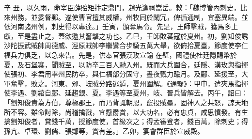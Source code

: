 \begin{pinyinscope}
 辛
 丑，以久雨，命宰臣薛貽矩抃定鼎門，趙光逢祠嵩岳。敕：「魏博管內刺史，比來州務，並委督郵。遂使曹官擅其威權，州牧同於閑冗，俾循通制，宜塞異端。並依河南諸州例，刺史得以專達。」壬寅，頒奪馬令。先是，王師擊賊，獲馬多上獻，至是盡止之，蓋欲邀其奮擊之功也。乙巳，王師敗蕃寇於夏州。初，劉知俊誘沙陀振武賊帥周德威、涇原賊帥李繼鸞合步騎五萬大舉，欲俯拾夏臺，節度使李仁福兵力俱乏，以急來告。先是，供奉官張漢玫宣諭
 在壁，國禮使杜廷隱賜幣於夏，及石堡寨，聞賊至，以防卒三百人馳入州。既而大兵圍合，廷隱、漢玫與指揮使張初、李君用率州民防卒，與仁福部分固守，晝夜戮力踰月。及鄜、延援至，大軍奮擊，敗之。河東、邠、岐賊分路逃遁，夏州圍解。《通鑒》：甲申，遣夾馬指揮使李遇、劉綰自鄜、延趨銀、夏。李遇等至夏州，岐、晉兵皆解去。丙午，詔曰：「劉知俊貴為方伯，尊極郡王，而乃背誕朝恩，竄投賊壘，固神人之共怒，諒天地所不容。雖命討除，尚稽擒戮，宜懸爵賞，以大功名，必有忠貞，咸思憤發。有生
 擒劉知俊者，賞錢千萬，授節度使，首級次之；得孟審登者，錢百萬，除刺史；得孫亢、卓環、劉儒、張鄰等，賞有差。」乙卯，宴會群臣於宣威殿。



\end{pinyinscope}